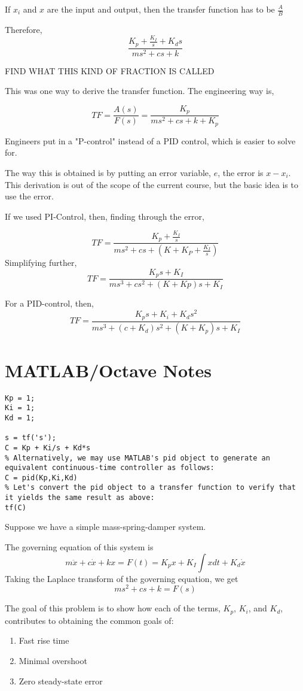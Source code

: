 \documentclass{report}
\begin{document}
If $x_i$ and $x$ are the input and output, then the transfer function has to be $\frac{A}{B}$

Therefore,
\[\frac{K_p + \frac{K_I}{s} + K_d s}{ms^2 + cs + k}\]
\begin{note}
	FIND WHAT THIS KIND OF FRACTION IS CALLED
\end{note}
This was one way to derive the transfer function. The engineering way is,

\[TF = \frac{A(s)}{F(s)} = \frac{K_p}{ms^2 + cs + k + K_p}\]

Engineers put in a "P-control" instead of a PID control, which is easier to solve for.

The way this is obtained is by putting an error variable, $e$, the error is $x - x_i$. This derivation is out of the scope of the current course, but the basic idea is to use the error.

If we used PI-Control, then, finding through the error,

\[TF = \frac{K_p + \frac{K_I}{s}}{ms^2 + cs + (K + K_P + \frac{K_I}{s})}\]
Simplifying further,
\[TF = \frac{K_p s + K_I}{ms^3 + cs^2 + (K + Kp)s + K_I}\]

For a PID-control, then,
\[TF = \frac{K_p s + K_i + K_d s^2}{ms^3 + (c + K_d)s^2 + (K + K_p)s + K_I}\]
\section{MATLAB/Octave Notes}
\begin{lstlisting}
Kp = 1;
Ki = 1;
Kd = 1;

s = tf('s');
C = Kp + Ki/s + Kd*s
% Alternatively, we may use MATLAB's pid object to generate an equivalent continuous-time controller as follows: 
C = pid(Kp,Ki,Kd)
% Let's convert the pid object to a transfer function to verify that it yields the same result as above:
tf(C)
\end{lstlisting}
Suppose we have a simple mass-spring-damper system.

The governing equation of this system is
\[m \ddot{x} + c\dot{x} + k x = F(t) = K_p x + K_I \int x dt + K_d \dot{x} \]
Taking the Laplace transform of the governing equation, we get
\[ms^2  + cs + k = F(s)\]

The goal of this problem is to show how each of the terms, $K_p$, $K_i$, and $K_d$, contributes to obtaining the common goals of:
\begin{enumerate}
	\item Fast rise time
	\item Minimal overshoot
	\item Zero steady-state error
 
\end{enumerate}
\end{document}
